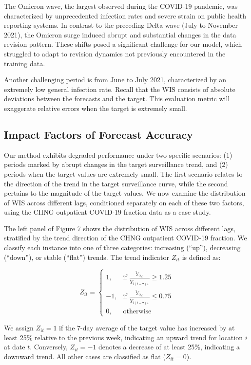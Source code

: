 The Omicron wave, the largest observed during the COVID-19 pandemic, was characterized by unprecedented infection rates and severe strain on public health reporting systems. In contrast to the preceding Delta wave (July to November 2021), the Omicron surge induced abrupt and substantial changes in the data revision pattern. These shifts posed a significant challenge for our model, which struggled to adapt to revision dynamics not previously encountered in the training data.

Another challenging period is from June to July 2021, characterized by an extremely low general infection rate. Recall that the WIS consists of absolute deviations between the forecasts and the target. This evaluation metric will exaggerate relative errors when the target is extremely small.


\subsection{Impact Factors of Forecast Accuracy}
Our method exhibits degraded performance under two specific scenarios: (1) periods marked by abrupt changes in the target surveillance trend, and (2) periods when the target values are extremely small. The first scenario relates to the direction of the trend in the target surveillance curve, while the second pertains to the magnitude of the target values. We now examine the distribution of WIS across different lags, conditioned separately on each of these two factors, using the CHNG outpatient COVID-19 fraction data as a case study.

The left panel of Figure 7 shows the distribution of WIS across different lags, stratified by the trend direction of the CHNG outpatient COVID-19 fraction. We classify each instance into one of three categories: increasing (“up”), decreasing (“down”), or stable (“flat”) trends. The trend indicator \( Z_{it} \) is defined as:

\[
Z_{it} =
\begin{cases}
    1, & \text{if } \frac{\widetilde{Y}_{itL}}{\widetilde{Y}_{i(t-7)L}} \geq 1.25 \\
    -1, & \text{if } \frac{\widetilde{Y}_{itL}}{\widetilde{Y}_{i(t-7)L}} \leq 0.75 \\
    0, & \text{otherwise}
\end{cases}
\]

We assign \( Z_{it} = 1 \) if the 7-day average of the target value has increased by at least 25\% relative to the previous week, indicating an upward trend for location \( i \) at date \( t \). Conversely, \( Z_{it} = -1 \) denotes a decrease of at least 25\%, indicating a downward trend. All other cases are classified as flat (\( Z_{it} = 0 \)).



